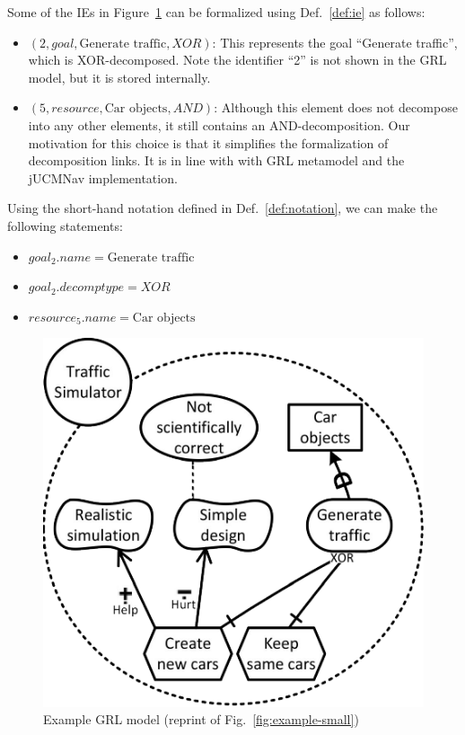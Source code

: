 Some of the IEs in Figure~\ref{fig:example-small2} can be formalized using Def.~\ref{def:ie} as follows:
\begin{itemize}
\item $(2, goal, \text{Generate traffic}, XOR)$: This represents the goal ``Generate traffic'', which is XOR-decomposed. Note the identifier ``2'' is not shown in the GRL model, but it is stored internally.
\item $(5, resource, \text{Car objects}, AND)$: Although this element does not decompose into any other elements, it still contains an AND-decomposition. Our motivation for this choice is that it simplifies the formalization of decomposition links. It is in line with with GRL metamodel and the jUCMNav implementation.
\end{itemize}

Using the short-hand notation defined in Def.~\ref{def:notation}, we can make the following statements:
\begin{itemize}
\item $goal_2.name = \text{Generate traffic}$
\item $goal_2.decomptype = XOR$
\item $resource_5.name = \text{Car objects}$
\end{itemize}

\begin{figure}[ht]
\centering
\includegraphics[width=\columnwidth]{img/Example1-new.pdf}
\caption{Example GRL model (reprint of Fig.~\ref{fig:example-small})}
\label{fig:example-small2}
\end{figure} 


